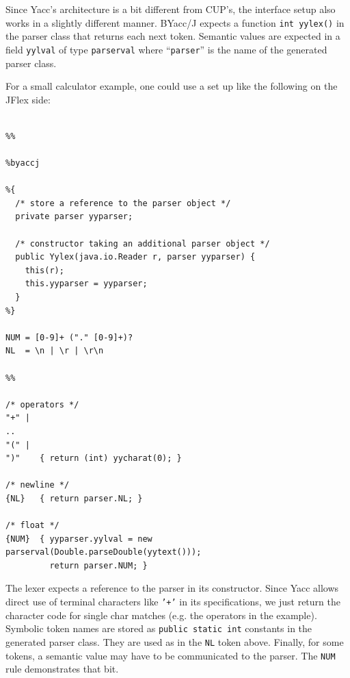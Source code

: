 \documentclass[11pt]{scrartcl}
\newcommand{\xsmall}{}
\begin{document}
Since Yacc's architecture is a bit different from CUP's, the
interface setup also works in a slightly different manner.
BYacc/J expects a function \texttt{int yylex()} in the parser
class that returns each next token. Semantic values are expected
in a field \texttt{yylval} of type \texttt{parserval} where ``\texttt{parser}''
is the name of the generated parser class.

For a small calculator example, one could use a set up like the 
following on the JFlex side:

{\xsmall\begin{verbatim}

%%

%byaccj

%{
  /* store a reference to the parser object */
  private parser yyparser;

  /* constructor taking an additional parser object */
  public Yylex(java.io.Reader r, parser yyparser) {
    this(r);
    this.yyparser = yyparser;
  }
%}

NUM = [0-9]+ ("." [0-9]+)?
NL  = \n | \r | \r\n

%%

/* operators */
"+" | 
..
"(" | 
")"    { return (int) yycharat(0); }

/* newline */
{NL}   { return parser.NL; }

/* float */
{NUM}  { yyparser.yylval = new parserval(Double.parseDouble(yytext()));
         return parser.NUM; }
\end{verbatim}
}

The lexer expects a reference to the parser in its constructor.
Since Yacc allows direct use of terminal characters like \texttt{'+'}
in its specifications, we just return the character code for
single char matches (e.g. the operators in the example). Symbolic
token names are stored as \texttt{public static int} constants in
the generated parser class. They are used as in the \texttt{NL} token
above. Finally, for some tokens, a semantic value may have to be 
communicated to the parser. The \texttt{NUM} rule demonstrates that
bit.
\end{document}

